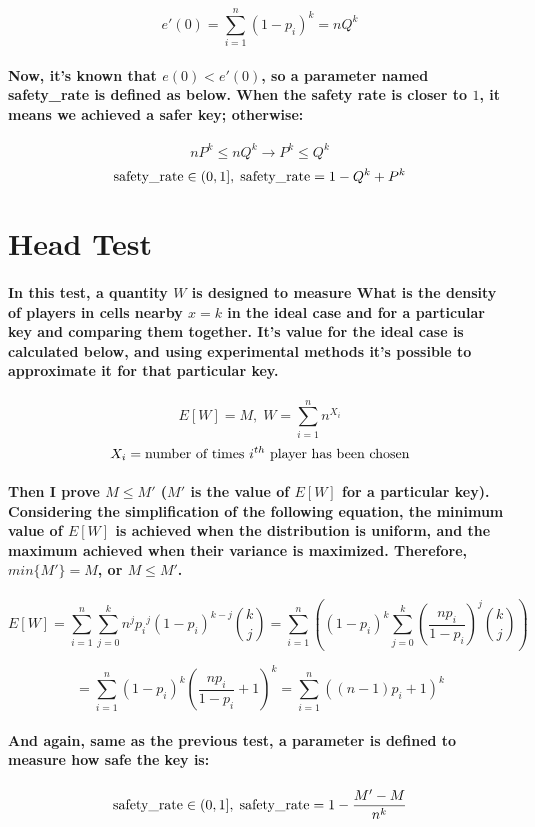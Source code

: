 \documentclass[oneside]{book}
\newcommand{\myparagraph}[1]{\paragraph{\textnormal{#1}}}
\begin{document}
$$e'(0) = \sum_{i=1}^{n} (1 - p_i)^k = n Q^k$$

\myparagraph{
Now, it's known that $e(0) < e'(0)$, so a parameter named safety\_rate is defined as below. When the safety rate is closer to $1$, it means we achieved a safer key; otherwise:
}

$$nP^k \le nQ^k \rightarrow P^k \le Q^k$$
$$\textnormal{safety\_rate} \in (0, 1], \; \textnormal{safety\_rate} = 1 - Q^k + P^k$$

\section{Head Test}

\myparagraph{
In this test, a quantity $W$ is designed to measure What is the density of players in cells nearby $x=k$ in the ideal case and for a particular key and comparing them together. It's value for the ideal case is calculated below, and using experimental methods it's possible to approximate it for that particular key.
}

$$E[W] = M, \; W = \sum_{i=1}^n n^{X_i}$$
$$X_i = \textnormal{number of times } i^{th} \textnormal{ player has been chosen}$$

\myparagraph{
Then I prove $M \le M'$ ($M'$ is the value of $E[W]$ for a particular key). Considering the simplification of the following equation, the minimum value of $E[W]$ is achieved when the distribution is uniform, and the maximum achieved when their variance is maximized. Therefore, $min\{M'\}=M$, or $M \le M'$.
}

$$E[W] = \sum_{i=1}^n \sum_{j=0}^k n^j {p_i}^j (1-p_i)^{k-j} \binom{k}{j} = \sum_{i=1}^n \left( (1-p_i)^k \sum_{j=0}^k \left( \frac{np_i}{1-p_i} \right)^j \binom{k}{j} \right)$$

$$= \sum_{i=1}^n (1-p_i)^k \left( \frac{np_i}{1-p_i} + 1 \right)^k = \sum_{i=1}^n ((n-1)p_i + 1)^k$$

\myparagraph{
 And again, same as the previous test, a parameter is defined to measure how safe the key is:
}

$$\textnormal{safety\_rate} \in (0, 1], \; \textnormal{safety\_rate} = 1 - \frac{M' - M}{n^k}$$
\end{document}
